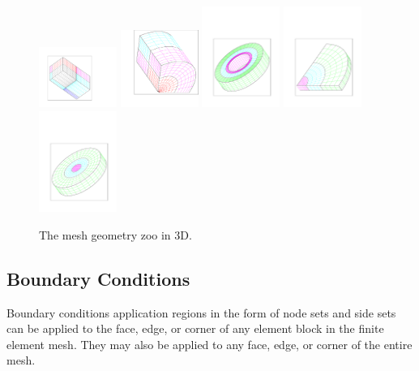 \begin{figure}[h]
    \centering
      \includegraphics[width=1.0in]{figures/brick}
      \includegraphics[width=1.0in]{figures/cubit_radial1}
      \includegraphics[width=1.0in]{figures/cubit_radial2}
      \includegraphics[width=1.0in]{figures/cubit_radial_trisection}
      \includegraphics[width=1.0in]{figures/cubit_radial_trisection2}
  \caption{The mesh geometry zoo in 3D.}
  \label{fig:btm}
\end{figure}

\subsection{Boundary Conditions}
Boundary conditions application regions in the form of node sets and side sets can be applied to the face, edge, or corner of any element block in the finite element mesh. They may also be applied to any face, edge, or corner of the entire mesh.
